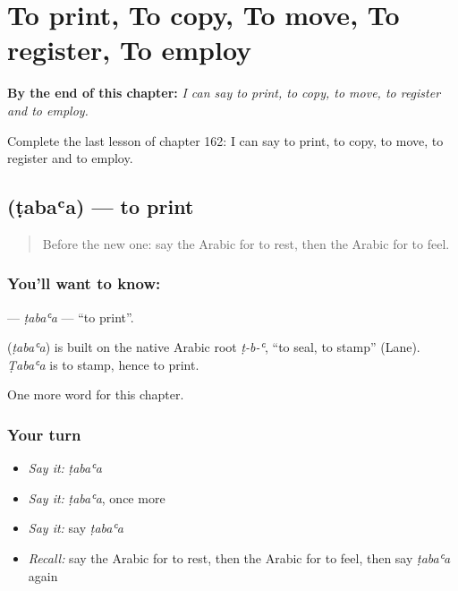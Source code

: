 
\chapter{To print, To copy, To move, To register, To employ}
\label{ch:ar-to-print-to-copy-to-move-to-register-to-employ}

\begin{chapteropening}
\textbf{By the end of this chapter:} \emph{I can say to print, to copy, to move, to register and to employ.}

Complete the last lesson of chapter 162: I can say to print, to copy, to move, to register and to employ.
\end{chapteropening}

\section[\texorpdfstring{\ar{طبع} (ṭabaʿa)}{طبع (ṭabaʿa)}]{ (ṭabaʿa) — to print}

\label{lesson:AR-C162-tabaa}



\begin{quote}
Before the new one: say the Arabic for to rest, then the Arabic for to feel.
\end{quote}

\subsection*{You'll want to know: }
\textbf{} — \emph{ṭabaʿa} — \textquotedblleft{}to print\textquotedblright{}.

\begin{cousinweb}
\textbf{} (\emph{ṭabaʿa}) is built on the native Arabic root \emph{ṭ-b-ʿ}, \textquotedblleft{}to seal, to stamp\textquotedblright{} (Lane). \emph{Ṭabaʿa} is to stamp, hence to print.
\end{cousinweb}

\begin{grammarlens}[title={What you've built}]
One more word for this chapter.
\end{grammarlens}

\subsection*{Your turn}
\begin{itemize}
\raggedright
  \item \emph{Say it:} \emph{ṭabaʿa}
  \item \emph{Say it:} \emph{ṭabaʿa}, once more
  \item \emph{Say it:} say \emph{ṭabaʿa}
  \item \emph{Recall:} say the Arabic for to rest, then the Arabic for to feel, then say \emph{ṭabaʿa} again
\end{itemize}

